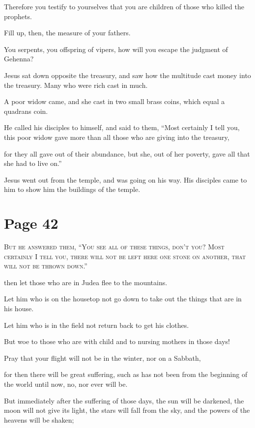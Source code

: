 Therefore you testify to yourselves that you are children of those who killed the prophets.

Fill up, then, the measure of your fathers.

You serpents, you offspring of vipers, how will you escape the judgment of Gehenna?

Jesus sat down opposite the treasury, and saw how the multitude cast money into the treasury. Many who were rich cast in much.

A poor widow came, and she cast in two small brass coins, which equal a quadrans coin.

He called his disciples to himself, and said to them, “Most certainly I tell you, this poor widow gave more than all those who are giving into the treasury,

for they all gave out of their abundance, but she, out of her poverty, gave all that she had to live on.”

Jesus went out from the temple, and was going on his way. His disciples came to him to show him the buildings of the temple.



\chapterornament
\section*{Page 42}

\lettrine{B}{ut he answered them, “You see all of these things, don’t you? Most certainly I tell you, there will not be left here one stone on another, that will not be thrown down.”}

then let those who are in Judea flee to the mountains.

Let him who is on the housetop not go down to take out the things that are in his house.

Let him who is in the field not return back to get his clothes.

But woe to those who are with child and to nursing mothers in those days!

Pray that your flight will not be in the winter, nor on a Sabbath,

for then there will be great suffering, such as has not been from the beginning of the world until now, no, nor ever will be.

But immediately after the suffering of those days, the sun will be darkened, the moon will not give its light, the stars will fall from the sky, and the powers of the heavens will be shaken;

